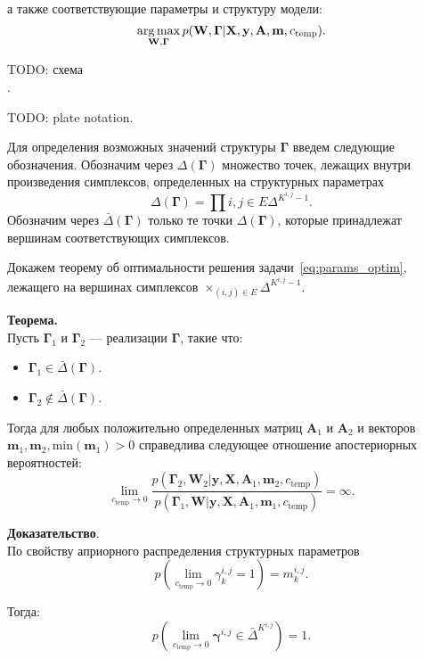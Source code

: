 а также соответствующие параметры и структуру модели:
\begin{equation}
\label{eq:params_optim}
    \operatorname*{arg\,max}_{\mathbf{W}, \boldsymbol{\Gamma}}  p(\mathbf{W}, \boldsymbol{\Gamma}|\mathbf{X},\mathbf{y}, \mathbf{A}, \mathbf{m}, {c_\text{temp}}).
\end{equation}

TODO: схема\\.

TODO: plate notation.

Для определения возможных значений структуры $\boldsymbol{\Gamma}$ введем следующие обозначения.
Обозначим через $\Delta(\boldsymbol{\Gamma})$ множество точек, лежащих внутри произведения симплексов, определенных на структурных параметрах
$$
\Delta(\boldsymbol{\Gamma}) =  \prod{i,j \in E}\Delta^{K^{i,j}-1}.
$$
Обозначим через $\bar{\Delta}(\boldsymbol{\Gamma})$ только те точки $\Delta(\boldsymbol{\Gamma})$, которые принадлежат вершинам соответствующих симплексов.


Докажем теорему об оптимальности решения задачи~\eqref{eq:params_optim}, лежащего на вершинах симплексов $\times_{(i,j) \in E} \Delta^{K^{i,j}-1}$. 


\textbf{Теорема.} \\
Пусть $\boldsymbol{\Gamma}_1$ и $\boldsymbol{\Gamma}_2$ --- реализации $\boldsymbol{\Gamma}$, такие что:
\begin{itemize}
\item $\boldsymbol{\Gamma}_1 \in \bar{\Delta}(\boldsymbol{\Gamma})$.
\item $\boldsymbol{\Gamma}_2 \not \in \bar{\Delta}(\boldsymbol{\Gamma})$.
\end{itemize} 
Тогда для любых положительно определенных матриц $\mathbf{A}_1$ и $\mathbf{A}_2$ и векторов $\mathbf{m}_1, \mathbf{m}_2, \text{min}(\mathbf{m}_1)>0$ справедлива следующее отношение апостериорных вероятностей:
$$\lim_{c_\text{temp} \to 0} \frac{p(\boldsymbol{\Gamma}_2, \mathbf{W}_2|\mathbf{y},  \mathbf{X},\mathbf{A}_1,\mathbf{m}_2, {c_\text{temp}})}{p(\boldsymbol{\Gamma}_1,  \mathbf{W}|\mathbf{y}, \mathbf{X},\mathbf{A}_1,\mathbf{m}_1, {c_\text{temp}})} = \infty.$$

\textbf{Доказательство}.\\
По свойству априорного распределения структурных параметров
$$p(\lim_{c_{\text{temp}} \to 0} {\gamma}^{i,j}_k  = 1) = {m}^{i,j}_k.$$

Тогда:
$$p(\lim_{c_{\text{temp}} \to 0} \boldsymbol{\gamma}^{i,j} \in \bar{\Delta}^{K^{i,j}}) = 1.$$

